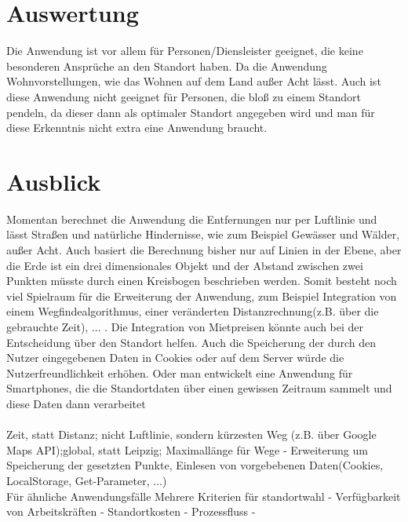 \documentclass[a4paper, twoside, 12pt]{scrreprt}
\begin{document}
\section{Auswertung}
Die Anwendung ist vor allem für Personen/Diensleister geeignet, die keine besonderen Ansprüche an den Standort haben. Da die Anwendung Wohnvorstellungen, wie das Wohnen auf dem Land außer Acht lässt. Auch ist diese Anwendung nicht geeignet für Personen, die bloß zu einem Standort pendeln, da dieser dann als optimaler Standort angegeben wird und man für diese Erkenntnis nicht extra eine Anwendung braucht.
\section{Ausblick}
Momentan berechnet die Anwendung die Entfernungen nur per Luftlinie und lässt Straßen und natürliche Hindernisse, wie zum Beispiel Gewässer und Wälder, außer Acht.
Auch basiert die Berechnung bisher nur auf Linien in der Ebene, aber die Erde ist ein drei dimensionales Objekt und der Abstand zwischen zwei Punkten müsste durch einen Kreisbogen beschrieben werden.
Somit besteht noch viel Spielraum für die Erweiterung der Anwendung, zum Beispiel Integration von einem Wegfindealgorithmus, einer veränderten Distanzrechnung(z.B. über die gebrauchte Zeit), ... .
Die Integration von Mietpreisen könnte auch bei der Entscheidung über den Standort helfen.
Auch die Speicherung der durch den Nutzer eingegebenen Daten in Cookies oder auf dem Server würde die Nutzerfreundlichkeit erhöhen. Oder man entwickelt eine Anwendung für Smartphones, die die Standortdaten über einen gewissen Zeitraum sammelt und diese Daten dann verarbeitet \\\\
Zeit, statt Distanz; nicht Luftlinie, sondern kürzesten Weg (z.B. über Google Maps API);global, statt Leipzig; Maximallänge für Wege
- Erweiterung um Speicherung der gesetzten Punkte, Einlesen von vorgebebenen Daten(Cookies, LocalStorage, Get-Parameter, ...)\\

Für ähnliche Anwendungsfälle
Mehrere Kriterien für standortwahl
- Verfügbarkeit von Arbeitskräften
- Standortkosten
- Prozessfluss
- 



\end{document}
